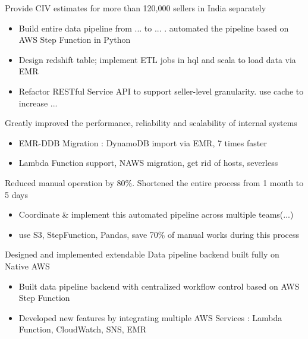 \documentclass[10pt,a4paper,ragged2e,withhyper]{altacv}
\begin{document}
\begin{paracol}{2}


   {Provide CIV estimates for more than 120,000 sellers in India separately}
  \begin{itemize}
    \item Build entire data pipeline from ... to ... . automated the pipeline based on AWS Step Function in Python
    \item Design redshift table; implement ETL jobs in hql and scala to load data via EMR
    \item Refactor RESTful Service API to support seller-level granularity. use cache to increase ...
  \end{itemize}

   {Greatly improved the performance, reliability and scalability of internal systems}
  \begin{itemize}
    \item EMR-DDB Migration : DynamoDB import via EMR, 7 times faster
    \item Lambda Function support, NAWS migration, get rid of hosts, severless
  \end{itemize}

   {Reduced manual operation by 80\%. Shortened the entire process from 1 month to 5 days}
  \begin{itemize}
    \item Coordinate \& implement this automated pipeline across multiple teams(...)
    \item use S3, StepFunction, Pandas, save 70\% of manual works during this process
  \end{itemize}

  \divider


   {Designed and implemented extendable Data pipeline backend built fully on Native AWS}
  \begin{itemize}
    \item Built data pipeline backend with centralized workflow control based on AWS Step Function
    \item Developed new features by integrating multiple AWS Services : Lambda Function, CloudWatch, SNS, EMR
  \end{itemize}


\end{paracol}
\end{document}
